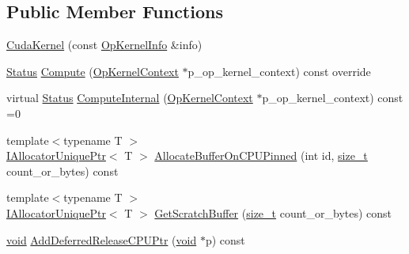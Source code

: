 \subsection*{Public Member Functions}
\begin{DoxyCompactItemize}
\item 
\mbox{\hyperlink{classonnxruntime_1_1cuda_1_1CudaKernel_a93fd220303820a25d350f9e336239056}{Cuda\+Kernel}} (const \mbox{\hyperlink{classonnxruntime_1_1OpKernelInfo}{Op\+Kernel\+Info}} \&info)
\item 
\mbox{\hyperlink{classonnxruntime_1_1common_1_1Status}{Status}} \mbox{\hyperlink{classonnxruntime_1_1cuda_1_1CudaKernel_ad0c6a6779d1fa5cc12c7437b01051405}{Compute}} (\mbox{\hyperlink{classonnxruntime_1_1OpKernelContext}{Op\+Kernel\+Context}} $\ast$p\+\_\+op\+\_\+kernel\+\_\+context) const override
\item 
virtual \mbox{\hyperlink{classonnxruntime_1_1common_1_1Status}{Status}} \mbox{\hyperlink{classonnxruntime_1_1cuda_1_1CudaKernel_aca7af04ae448017d6023d30bba231ebb}{Compute\+Internal}} (\mbox{\hyperlink{classonnxruntime_1_1OpKernelContext}{Op\+Kernel\+Context}} $\ast$p\+\_\+op\+\_\+kernel\+\_\+context) const =0
\item 
{\footnotesize template$<$typename T $>$ }\\\mbox{\hyperlink{namespaceonnxruntime_a323aace024f171700e4b07b299a178e7}{I\+Allocator\+Unique\+Ptr}}$<$ T $>$ \mbox{\hyperlink{classonnxruntime_1_1cuda_1_1CudaKernel_aa44b8fb4000256df5b257da1356d25f9}{Allocate\+Buffer\+On\+C\+P\+U\+Pinned}} (int id, \mbox{\hyperlink{mlasi_8h_a503efbc1c6e50825320ad909366b78ab}{size\+\_\+t}} count\+\_\+or\+\_\+bytes) const
\item 
{\footnotesize template$<$typename T $>$ }\\\mbox{\hyperlink{namespaceonnxruntime_a323aace024f171700e4b07b299a178e7}{I\+Allocator\+Unique\+Ptr}}$<$ T $>$ \mbox{\hyperlink{classonnxruntime_1_1cuda_1_1CudaKernel_ac9edde9eb3d36bdeb937f058a2e3ef57}{Get\+Scratch\+Buffer}} (\mbox{\hyperlink{mlasi_8h_a503efbc1c6e50825320ad909366b78ab}{size\+\_\+t}} count\+\_\+or\+\_\+bytes) const
\item 
\mbox{\hyperlink{mlasi_8h_a88f941d423cb2a819b70a1358982b1a6}{void}} \mbox{\hyperlink{classonnxruntime_1_1cuda_1_1CudaKernel_a408371d09df4c116a8076ec40260d202}{Add\+Deferred\+Release\+C\+P\+U\+Ptr}} (\mbox{\hyperlink{mlasi_8h_a88f941d423cb2a819b70a1358982b1a6}{void}} $\ast$p) const
\end{DoxyCompactItemize}
